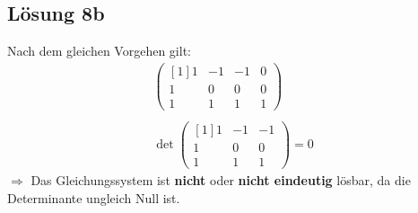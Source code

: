 \documentclass[main.tex]{subfiles}
\begin{document}
\subsection{Lösung 8b}
Nach dem gleichen Vorgehen gilt:
\begin{gather*}
    \begin{pmatrix}[1]
    1 & -1 & -1 & 0\\
    1 & 0 & 0 & 0\\
    1 & 1 & 1 & 1
    \end{pmatrix}\\
    \\
    \det\begin{pmatrix}[1]
    1 & -1 & -1\\
    1 & 0 & 0\\
    1 & 1 & 1
    \end{pmatrix} =0
\end{gather*}
$\Rightarrow$ Das Gleichungssystem ist \textbf{nicht} oder \textbf{nicht eindeutig} lösbar, da die Determinante ungleich Null ist.
\end{document}
